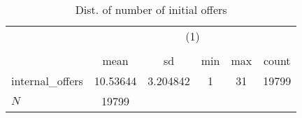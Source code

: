 \begin{table}[htbp]\centering
\def\sym#1{\ifmmode^{#1}\else\(^{#1}\)\fi}
\caption{Dist. of number of initial offers}
\begin{tabular}{l*{1}{ccccc}}
\hline\hline
            &\multicolumn{5}{c}{(1)}                                         \\
            &\multicolumn{5}{c}{}                                            \\
            &        mean&          sd&         min&         max&       count\\
\hline
internal\_offers&    10.53644&    3.204842&           1&          31&       19799\\
\hline
\(N\)       &       19799&            &            &            &            \\
\hline\hline
\end{tabular}
\end{table}
